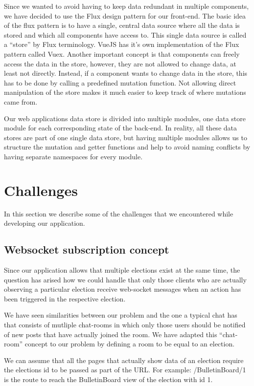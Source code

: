 Since we wanted to avoid having to keep data redundant in multiple components, we have decided to use the Flux design pattern for our front-end. The basic idea of the flux pattern is to have a single, central data source where all the data is stored and which all components have access to. This single data source is called a "`store"' by Flux terminology. VueJS has it's own implementation of the Flux pattern called Vuex. Another important concept is that components can freely access the data in the store, however, they are not allowed to change data, at least not directly. Instead, if a component wants to change data in the store, this has to be done by calling a predefined mutation function. Not allowing direct manipulation of the store makes it much easier to keep track of where mutations came from.

Our web applications data store is divided into multiple modules, one data store module for each corresponding state of the back-end. In reality, all these data stores are part of one single data store, but having multiple modules allows us to structure the mutation and getter functions and help to avoid naming conflicts by having separate namespaces for every module.
 
\section{Challenges}
In this section we describe some of the challenges that we encountered while developing our application. 
\subsection{Websocket subscription concept}
Since our application allows that multiple elections exist at the same time, the question has arised how we could handle that only those clients who are actually observing a particular election receive web-socket messages when an action has been triggered in the respective election.

We have seen similarities between our problem and the one a typical chat has that consists of mutliple chat-rooms in which only those users should be notified of new posts that have actually joined the room. We have adapted this "`chat-room"' concept to our problem by defining a room to be equal to an election.

We can assume that all the pages that actually show data of an election require the elections id to be passed as part of the URL. For example: /BulletinBoard/1 is the route to reach the BulletinBoard view of the election with id 1.

